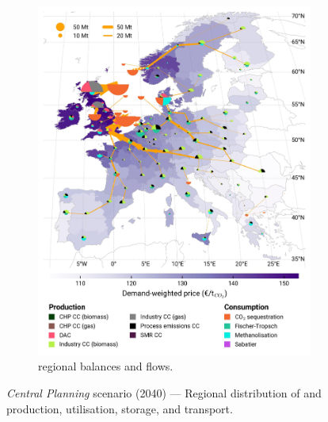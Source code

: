 \documentclass[preprint,12pt,sort&compress]{elsarticle}
\begin{document}
\begin{figure}[htbp]
\begin{subfigure}[t]{0.49\textwidth}
      \includegraphics[width=1\textwidth]{maps/greenfield-pipelines/base_s_adm___2040-balance_map_co2_stored} 
      \vspace{-0.7cm}
      \caption{ regional balances and flows.}
      \label{fig:CP_lt_2040_co2}
  \end{subfigure}
  \caption{\textit{Central Planning} scenario (2040) --- Regional distribution of  and  production, utilisation, storage, and transport.}
  \label{fig:CP_lt_2040}
\end{figure}
\end{document}
